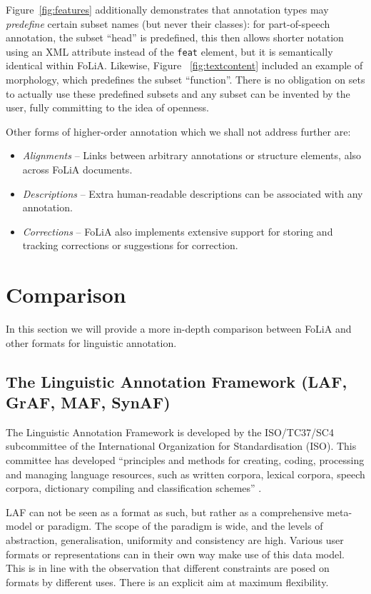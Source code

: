 \documentclass[a4paper,10pt,twoside]{article}
\begin{document}
Figure~\ref{fig:features} additionally demonstrates that annotation types may \emph{predefine} certain subset
names (but never their classes): for part-of-speech annotation, the subset ``head''
is predefined, this then allows shorter notation using an XML attribute instead
of the \texttt{feat} element, but it is semantically identical within FoLiA.  Likewise,
Figure~ \ref{fig:textcontent} included an example of morphology, which predefines
the subset ``function''. There is no obligation on sets to actually use these
predefined subsets and any subset can be invented by the user, fully committing
to the idea of openness. %

Other forms of higher-order annotation which we shall not address further are:

\begin{itemize}
  \item \emph{Alignments} -- Links \cite{XLINK} between arbitrary annotations or structure
elements, also across FoLiA documents.  
  \item \emph{Descriptions} -- Extra human-readable descriptions can be associated with any annotation.
  \item \emph{Corrections} -- FoLiA also implements extensive support for storing and tracking
corrections or suggestions for correction.
\end{itemize}

\section{Comparison}
\label{sec:comparison}

In this section we will provide a more in-depth comparison between FoLiA and
other formats for linguistic annotation.

\subsection{The Linguistic Annotation Framework (LAF, GrAF, MAF, SynAF)}
\label{sec:LAF}

The Linguistic Annotation Framework is developed by the ISO/TC37/SC4
subcommittee of the International Organization for Standardisation (ISO). This
committee has developed ``principles and methods for creating, coding,
processing and managing language resources, such as written corpora, lexical
corpora, speech corpora, dictionary compiling and classification schemes''
\cite{LAF}. 

LAF can not be seen as a format as such, but rather as a comprehensive
meta-model or paradigm. The scope of the paradigm is wide, and the levels of
abstraction, generalisation, uniformity and consistency are high. Various user
formats or representations can in their own way make use of this data model.
This is in line with the observation that different constraints are posed on
formats by different uses.  There is an explicit aim at maximum flexibility. 
\end{document}
